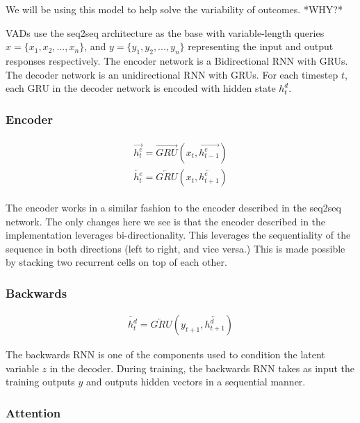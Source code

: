 \documentclass[12pt,twoside]{report}
\begin{document}
We will be using this model to help solve the variability of outcomes. *WHY?*

VADs use the seq2seq architecture as the base with variable-length queries $x = \{x_1, x_2, ..., x_n\}$, and $y = \{y_1, y_2, ..., y_n\}$ representing the input and output responses respectively. The encoder network is a Bidirectional RNN with GRUs. The decoder network is an unidirectional RNN with GRUs. For each timestep $t$, each GRU in the decoder network is encoded with hidden state $h^d_t$.


\subsubsection{Encoder}

\begin{align}
\label{eqn:eqlabel}
\begin{split}
	\overrightarrow{h^e_t} = \overrightarrow{GRU}(x_t, \overrightarrow{h^e_{t-1}})
\\
\overleftarrow{h^e_t} = \overleftarrow{GRU}(x_t, \overleftarrow{h^e_{t+1}})
\end{split}
\end{align}

The encoder works in a similar fashion to the encoder described in the seq2seq network. The only changes here we see is that the encoder described in the implementation leverages bi-directionality. This leverages the sequentiality of the sequence in both directions (left to right, and vice versa.) This is made possible by stacking two recurrent cells on top of each other. 

\subsubsection{Backwards}

\begin{align}
\label{eqn:eqback}
\overleftarrow{h^d_t} = \overleftarrow{GRU}(y_{t+1}, \overleftarrow{h^d_{t+1}})
\end{align}

The backwards RNN is one of the components used to condition the latent variable $z$ in the decoder. During training, the backwards RNN takes as input the training outputs $y$ and outputs hidden vectors in a sequential manner.

\subsubsection{Attention}
\end{document}
